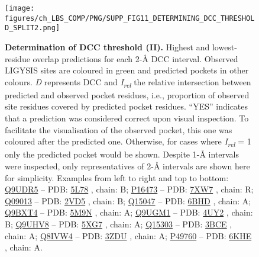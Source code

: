 
\begin{figure}[p]
    \centering
    \texttt{[image: figures/ch\_LBS\_COMP/PNG/SUPP\_FIG11\_DETERMINING\_DCC\_THRESHOLD\_SPLIT2.png]}
    \caption[Determination of DCC threshold (II)]{\textbf{Determination of DCC threshold (II).} Highest and lowest-residue overlap predictions for each 2-\AA{} DCC interval. Observed LIGYSIS sites are coloured in green and predicted pockets in other colours. \textit{D} represents DCC and \textit{I\textsubscript{rel}} the relative intersection between predicted and observed pocket residues, i.e., proportion of observed site residues covered by predicted pocket residues. ``YES'' indicates that a prediction was considered correct upon visual inspection. To facilitate the visualisation of the observed pocket, this one was coloured after the predicted one. Otherwise, for cases where \textit{I\textsubscript{rel}} = 1 only the predicted pocket would be shown. Despite 1-\AA{} intervals were inspected, only representatives of 2-\AA{} intervals are shown here for simplicity. Examples from left to right and top to bottom: \href{https://www.uniprot.org/uniprotkb/Q9UDR5/entry}{Q9UDR5} -- PDB: \href{https://www.ebi.ac.uk/pdbe/entry/pdb/5L78}{5L78} \cite{PDB_5L78}, chain: B; \href{https://www.uniprot.org/uniprotkb/P16473/entry}{P16473} -- PDB: \href{https://www.ebi.ac.uk/pdbe/entry/pdb/7XW7}{7XW7} \cite{DUAN_2022_THYROTROPIN}, chain: R; \href{https://www.uniprot.org/uniprotkb/Q09013/entry}{Q09013} -- PDB: \href{https://www.ebi.ac.uk/pdbe/entry/pdb/2VD5}{2VD5} \cite{ELKINS_2009_KINASE}, chain: B; \href{https://www.uniprot.org/uniprotkb/Q15047/entry}{Q15047} -- PDB: \href{https://www.ebi.ac.uk/pdbe/entry/pdb/6BHD}{6BHD} \cite{JURKOWSKA_2017_H3K9}, chain: A; \href{https://www.uniprot.org/uniprotkb/Q9BXT4/entry}{Q9BXT4} -- PDB: \href{https://www.ebi.ac.uk/pdbe/entry/pdb/5M9N}{5M9N} \cite{PDB_5M9N}, chain: A; \href{https://www.uniprot.org/uniprotkb/Q9UGM1/entry}{Q9UGM1} -- PDB: \href{https://www.ebi.ac.uk/pdbe/entry/pdb/4UY2}{4UY2} \cite{ZOURIDAKIS_2014_NICOTINIC}, chain: B; \href{https://www.uniprot.org/uniprotkb/Q9UHV8/entry}{Q9UHV8} -- PDB: \href{https://www.ebi.ac.uk/pdbe/entry/pdb/5XG7}{5XG7} \cite{SU_2018_GALECTIN}, chain: A; \href{https://www.uniprot.org/uniprotkb/Q15303/entry}{Q15303} -- PDB: \href{https://www.ebi.ac.uk/pdbe/entry/pdb/3BCE}{3BCE} \cite{QIU_2008_HER4}, chain: A; \href{https://www.uniprot.org/uniprotkb/Q8IVW4/entry}{Q8IVW4} -- PDB: \href{https://www.ebi.ac.uk/pdbe/entry/pdb/3ZDU}{3ZDU} \cite{CANNING_2018_CDKL}, chain: A; \href{https://www.uniprot.org/uniprotkb/P49760/entry}{P49760} -- PDB: \href{https://www.ebi.ac.uk/pdbe/entry/pdb/6KHE}{6KHE} \cite{LEE_2019_CDC2}, chain: A.}
    \label{fig:DCC_determination2}
\end{figure}

